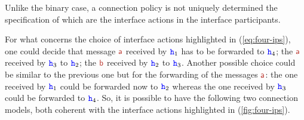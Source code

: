 Unlike the binary case, a connection policy is not uniquely determined the specification
of which are the interface actions in the interface participants.

For what concerns  the choice of interface actions highlighted in (\ref{eq:four-ips}),
 one could decide that message $\msg[a]$ received by ${\mathtt{\color{blue}{ {h}}}}_1$ has 
 to be forwarded
 to ${\mathtt{\color{blue}{ {h}}}}_4$; the $\msg[a]$ received by ${\mathtt{\color{blue}{ {h}}}}_3$
 to ${\mathtt{\color{blue}{ {h}}}}_2$; the $\msg[b]$ received by ${\mathtt{\color{blue}{ {h}}}}_2$ to ${\mathtt{\color{blue}{ {h}}}}_3$.
 Another possible choice 
could be similar to the previous one but for the forwarding
of the messages $\msg[a]$: the one received by ${\mathtt{\color{blue}{ {h}}}}_1$ could be forwarded now to ${\mathtt{\color{blue}{ {h}}}}_2$
whereas the one received by ${\mathtt{\color{blue}{ {h}}}}_3$ could be forwarded to ${\mathtt{\color{blue}{ {h}}}}_4$. 
So, it is possible to have the following two connection models, both coherent
with the interface actions highlighted in (\ref{fig:four-ips}).  
 

